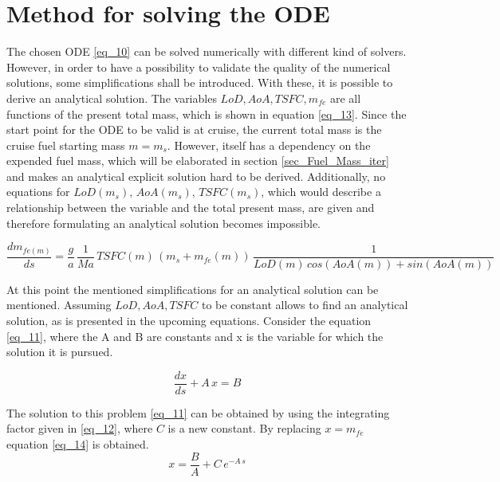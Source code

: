 
\section{Method for solving the ODE}
\label{sec_Solve_ODE}
The chosen ODE \eqref{eq_10} can be solved numerically 
with different kind of solvers. However, in order to 
have a possibility to validate the
quality of the numerical 
solutions, some simplifications shall be introduced. 
With these, it is possible to derive an 
analytical solution. The variables 
$LoD, AoA, TSFC, m_{fe}$ are all functions 
of the present total mass, which is shown in 
equation \eqref{eq_13}. Since the start 
point for the ODE to be valid is at cruise, the 
current total mass is the cruise fuel starting 
mass $m = m_s$. However, itself 
has a dependency on the expended fuel mass,
which will be elaborated in 
section \ref{sec_Fuel_Mass_iter} and makes 
an analytical explicit solution hard to be derived. Additionally, no 
equations for $LoD(m_s), \,AoA(m_s), \,TSFC(m_s)$, which 
would describe a relationship between the variable 
and the total present mass, are 
given and therefore formulating an analytical solution becomes 
impossible.\newline

\begin{equation}
    \label{eq_13}  
    \frac{dm_{fe(m)}}{ds} = \frac{g}{a} \, \frac{1}{Ma}\,TSFC(m) \,(m_s + m_{fe}(m))
    \, \frac{1}{
        LoD(m) \, cos(AoA(m)) + sin(AoA(m))}  
\end{equation}

At this point the mentioned 
simplifications for an analytical solution 
can be mentioned. Assuming $LoD, AoA, TSFC$
to be constant allows to find an analytical
solution, as is presented in the upcoming equations. Consider the 
equation \eqref{eq_11}, where the 
A and B are constants and x is the 
variable for which the solution it is 
pursued.


\begin{equation}
    \label{eq_11}
    \frac{dx}{ds} + A\,x = B
\end{equation}

The solution to this problem \eqref{eq_11} can be 
obtained by using the integrating factor 
given in \eqref{eq_12}, where $C$ is a new 
constant. By replacing $x = m_{fe}$ equation 
\eqref{eq_14} is obtained. 
\begin{equation}
    \label{eq_12}
    x = \frac{B}{A} + C\, e^{-A\, s}
\end{equation}
 
